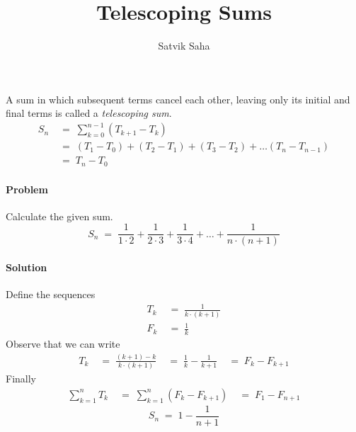 \documentclass[a4paper, 11pt, reqno]{article}
\title{Telescoping Sums}
\author{Satvik Saha}
\date{}
\newcounter{prob}
\def\problem{\stepcounter{prob}\paragraph{Problem \arabic{prob}}}
\def\solution{\paragraph{Solution}}
\begin{document}
	\maketitle
	
	A sum in which subsequent terms cancel each other, leaving only its initial and final terms is called a
	\textit{telescoping sum}.
	\begin{align*}
		S_n  \; &= \; \sum_{k=0}^{n-1} (T_{k+1} - T_{k})	\\
		     \; &= \; (T_1 - T_0) + (T_2 - T_1) + (T_3 - T_2) + \dots (T_{n} - T_{n-1})	\\
		     \; &= \; T_{n} - T_{0}
	\end{align*}
	
	\problem
	Calculate the given sum.
	\begin{equation*}
		S_n  \; = \;  \frac{1}{1\cdot 2} + \frac{1}{2\cdot 3} + \frac{1}{3\cdot 4} + \dots + \frac{1}{n\cdot (n+1)} 
	\end{equation*}
	\solution
	Define the sequences
	\begin{align*}
		T_k  \; &= \; \frac{1}{k\cdot (k + 1)} \\
		F_k  \; &= \; \frac{1}{k}
	\end{align*}
	Observe that we can write
	\begin{align*}
		T_k 	\; &= \; \frac{(k + 1) - k}{k\cdot (k + 1)}
			\; &= \; \frac{1}{k} - \frac{1}{k + 1}
			\; &= \; F_k - F_{k + 1}
	\end{align*}
	Finally
	\begin{align*}
		\sum_{k=1}^{n} T_k 	\; &= \; \sum_{k=1}^{n} (F_k - F_{k+1})
					\; &= \; F_1 - F_{n + 1}
	\end{align*}
	\begin{equation*}
		\boxed{S_n \; = \;  1 - \frac{1}{n + 1}}
	\end{equation*}
	
\end{document}
